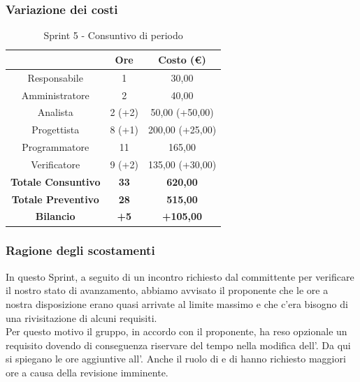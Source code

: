 \subsubsection{Variazione dei costi} \label{subsubsection:variazione_costi_sprint6}

\begin{table}[H]
  \centering
  \renewcommand{\arraystretch}{1.8}
  \begin{tabular}{c|c|c}
    \rowcolor[HTML]{125E28}
    \multicolumn{1}{c}{\color[HTML]{FFFFFF}\textbf{Ruolo}} &
    \multicolumn{1}{c}{\color[HTML]{FFFFFF}\textbf{Ore}}   &
    \multicolumn{1}{c}{\color[HTML]{FFFFFF}\textbf{Costo (€)}}                              \\
    \hline
    Responsabile                                           & 1           & 30,00            \\
    Amministratore                                         & 2           & 40,00            \\
    Analista                                               & 2 (+2)      & 50,00 (+50,00)   \\
    Progettista                                            & 8 (+1)      & 200,00 (+25,00)  \\
    Programmatore                                          & 11          & 165,00           \\
    Verificatore                                           & 9 (+2)      & 135,00 (+30,00)  \\
    \textbf{Totale Consuntivo}                             & \textbf{33} & \textbf{620,00}  \\
    \textbf{Totale Preventivo}                             & \textbf{28} & \textbf{515,00}  \\
    \textbf{Bilancio}                                      & \textbf{+5} & \textbf{+105,00} \\
  \end{tabular}
  \caption{Sprint 5 - Consuntivo di periodo}
\end{table}

\subsubsection{Ragione degli scostamenti} \label{subsubsection:ragione_scostamenti_sprint6}
In questo Sprint\glo{}, a seguito di un incontro richiesto dal committente per verificare il nostro stato di avanzamento, abbiamo avvisato il proponente che le ore a nostra disposizione erano quasi arrivate al limite massimo e che c'era bisogno di una rivisitazione di alcuni requisiti.
\\Per questo motivo il gruppo, in accordo con il proponente, ha reso opzionale un requisito dovendo di conseguenza riservare del tempo nella modifica dell'\docNameVersionAdR{}. Da qui si spiegano le ore aggiuntive all'\roleAnalystLow{}.
Anche il ruolo di \roleDesignerLow{} e di \roleVerifierLow{} hanno richiesto maggiori ore a causa della revisione imminente.


